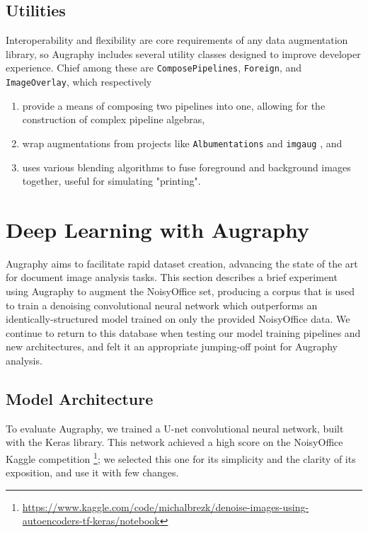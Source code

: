 \documentclass[runningheads]{llncs}
\begin{document}
\subsection{Utilities}\label{utilities}
Interoperability and flexibility are core requirements of any data augmentation library, so Augraphy includes several utility classes designed to improve developer experience. Chief among these are \texttt{ComposePipelines}, \texttt{Foreign}, and \texttt{ImageOverlay}, which respectively

\begin{enumerate}
\item provide a means of composing two pipelines into one, allowing for the construction of complex pipeline algebras,
\item wrap augmentations from projects like \texttt{Albumentations} \cite{ref_albumentations} and \texttt{imgaug} \cite{ref_imgaug}, and
\item uses various blending algorithms to fuse foreground and background images together, useful for simulating "printing".
\end{enumerate}
\section{Deep Learning with Augraphy}
Augraphy aims to facilitate rapid dataset creation, advancing the state of the art for document image analysis tasks. This section describes a brief experiment using Augraphy to augment the NoisyOffice set, producing a corpus that is used to train a denoising convolutional neural network which outperforms an identically-structured model trained on only the provided NoisyOffice data. We continue to return to this database when testing our model training pipelines and new architectures, and felt it an appropriate jumping-off point for Augraphy analysis.

\subsection{Model Architecture}
To evaluate Augraphy, we trained a U-net convolutional neural network, built with the Keras library. This network achieved a high score on the NoisyOffice Kaggle competition \footnote{\url{https://www.kaggle.com/code/michalbrezk/denoise-images-using-autoencoders-tf-keras/notebook}}; we selected this one for its simplicity and the clarity of its exposition, and use it with few changes.\\
\end{document}
